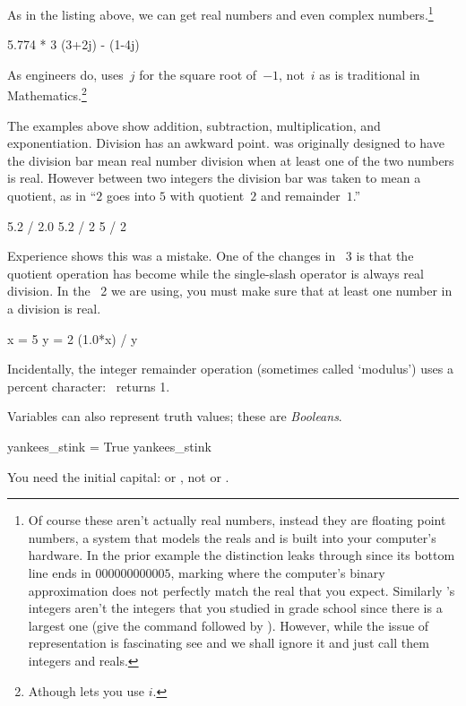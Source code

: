 As in the listing above, we can get real 
numbers 
and even complex numbers.\footnote{Of course these aren't actually 
real numbers, instead they are floating point numbers, a system that
models the reals and is built into your computer's hardware.
In the prior example the distinction leaks through
since its bottom line ends in $000000000005$, marking where
the computer's binary approximation does not perfectly match
the real that you expect.
Similarly \protect\python's integers aren't the integers that you studied
in grade school since there is a largest one (give \python{} the 
command \protect{} followed by 
\protect{}). 
However, while the issue of representation is fascinating\protect\Dash
see \protect\cite{PythonTeam12a} and \protect\cite{Goldberg91}\protect\Dash
we shall ignore it and just call them integers and reals.}
\begin{pythonoutput}
5.774 * 3
(3+2j) - (1-4j)
\end{pythonoutput}
\noindent As engineers do, \python{} uses~$j$ for the square
root of~$-1$, not~$i$ as is traditional in Mathematics.\footnote{Athough
\protect\Sage{} lets you use $i$.}

The examples above show addition, subtraction, multiplication, 
and exponentiation. 
Division has an awkward point.
\python{} was originally designed to have the division bar
\inlinecode{/} mean real number division 
when at least one of the two numbers is real.
However between two integers the division bar was taken to mean 
a quotient, as in ``$2$ goes into $5$ with quotient~$2$ and remainder~$1$.''
\begin{pythonoutput}
5.2 / 2.0
5.2 / 2
5 / 2
\end{pythonoutput}
Experience shows this was a mistake. 
One of the changes in \python~3
is that the quotient operation has become \inlinecode{//}
while the single-slash operator is always real division.
In the \python~2 we are using, you must make sure that at least one
number in a division is real.
\begin{pythonoutput}
x = 5
y = 2
(1.0*x) / y
\end{pythonoutput}
\noindent Incidentally, 
the integer remainder operation (sometimes called `modulus')  
uses a percent character:~ returns 1.

Variables can also represent truth values; these are \textit{Booleans}.
\begin{pythonoutput}
yankees_stink = True
yankees_stink
\end{pythonoutput}
\noindent You need the initial capital:
or , not
or .
 
